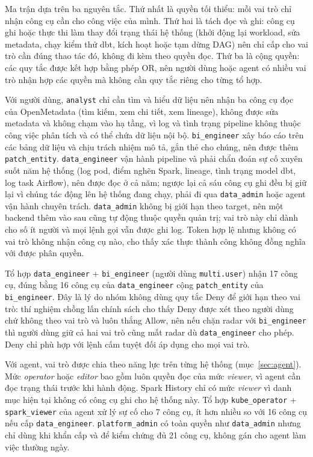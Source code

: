 Ma trận dựa trên ba nguyên tắc. Thứ nhất là quyền tối thiểu: mỗi vai trò chỉ nhận công cụ cần cho công việc của mình. Thứ hai là tách đọc và ghi: công cụ ghi hoặc thực thi làm thay đổi trạng thái hệ thống (khởi động lại workload, sửa metadata, chạy kiểm thử dbt, kích hoạt hoặc tạm dừng DAG) nên chỉ cấp cho vai trò cần đúng thao tác đó, không đi kèm theo quyền đọc. Thứ ba là cộng quyền: các quy tắc được kết hợp bằng phép OR, nên người dùng hoặc agent có nhiều vai trò nhận hợp các quyền mà không cần quy tắc riêng cho từng tổ hợp.

Với người dùng, \texttt{analyst} chỉ cần tìm và hiểu dữ liệu nên nhận ba công cụ đọc của OpenMetadata (tìm kiếm, xem chi tiết, xem lineage), không được sửa metadata và không chạm vào hạ tầng, vì log và tình trạng pipeline không thuộc công việc phân tích và có thể chứa dữ liệu nội bộ. \texttt{bi\_engineer} xây báo cáo trên các bảng dữ liệu và chịu trách nhiệm mô tả, gắn thẻ cho chúng, nên được thêm \texttt{patch\_entity}. \texttt{data\_engineer} vận hành pipeline và phải chẩn đoán sự cố xuyên suốt năm hệ thống (log pod, điểm nghẽn Spark, lineage, tình trạng model dbt, log task Airflow), nên được đọc ở cả năm; ngược lại cả sáu công cụ ghi đều bị giữ lại vì chúng tác động lên hệ thống đang chạy, phải đi qua \texttt{data\_admin} hoặc agent vận hành chuyên trách. \texttt{data\_admin} không bị giới hạn theo target, nên một backend thêm vào sau cũng tự động thuộc quyền quản trị; vai trò này chỉ dành cho số ít người và mọi lệnh gọi vẫn được ghi log. Token hợp lệ nhưng không có vai trò không nhận công cụ nào, cho thấy xác thực thành công không đồng nghĩa với được phân quyền.

Tổ hợp \texttt{data\_engineer} + \texttt{bi\_engineer} (người dùng \texttt{multi.user}) nhận 17 công cụ, đúng bằng 16 công cụ của \texttt{data\_engineer} cộng \texttt{patch\_entity} của \texttt{bi\_engineer}. Đây là lý do nhóm không dùng quy tắc Deny để giới hạn theo vai trò: thí nghiệm chồng lấn chính sách cho thấy Deny được xét theo người dùng chứ không theo vai trò và luôn thắng Allow, nên nếu chặn radar với \texttt{bi\_engineer} thì người dùng giữ cả hai vai trò cũng mất radar dù \texttt{data\_engineer} cho phép. Deny chỉ phù hợp với lệnh cấm tuyệt đối áp dụng cho mọi vai trò.

Với agent, vai trò được chia theo năng lực trên từng hệ thống (mục~\ref{sec:agent}). Mức \textit{operator} hoặc \textit{editor} bao gồm luôn quyền đọc của mức \textit{viewer}, vì agent cần đọc trạng thái trước khi hành động. Spark History chỉ có mức \textit{viewer} vì danh mục hiện tại không có công cụ ghi cho hệ thống này. Tổ hợp \texttt{kube\_operator} + \texttt{spark\_viewer} của agent xử lý sự cố cho 7 công cụ, ít hơn nhiều so với 16 công cụ nếu cấp \texttt{data\_engineer}. \texttt{platform\_admin} có toàn quyền như \texttt{data\_admin} nhưng chỉ dùng khi khẩn cấp và để kiểm chứng đủ 21 công cụ, không gán cho agent làm việc thường ngày.

